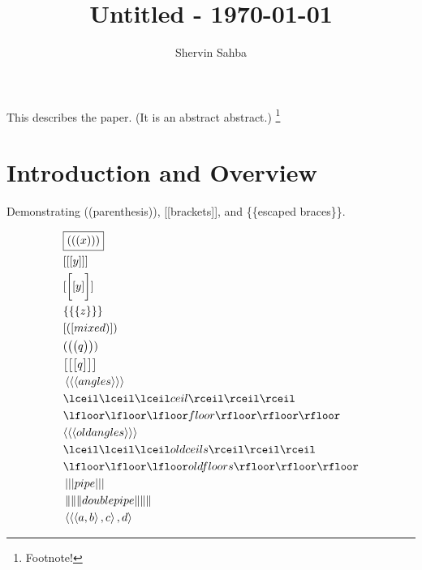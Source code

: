\documentclass{shervin} %
\begin{document}
\title{Untitled - \today}

\author{Shervin Sahba\authormark{}}
\address{\authormark{}Department of Physics, University of Washington, Seattle, USA.}

\begin{abstract*}
This describes the paper. (It is an abstract abstract.) \footnote{Footnote!}
\end{abstract*}


\section{Introduction and Overview} \label{sec: Introduction}

Demonstrating ((parenthesis)), [[brackets]], and \{\{escaped braces\}\}.

\begin{tcolorbox}[title=Cool Box, fonttitle=\bfseries, titlebox=visible, sidebyside, enhanced, frame style={left color=red!75!black,right color=blue!75!black}]
\begin{align}
&\boxed{(((x)))} \\
& [[[y]]] \\
& [\bigg[[y]\bigg]] \\
& \{\{\{z\}\}\} \\
& [([mixed)]) \\
& (\lp\lp q \rp\rp) \\
& \lb\lb\lb q \rb\rb\rb \\
& \langle\langle\langle angles \rangle\rangle\rangle \\
& \lceil\lceil\lceil ceil \rceil\rceil\rceil \\
& \lfloor\lfloor\lfloor floor \rfloor\rfloor\rfloor \\
& \oldlangle\oldlangle\oldlangle old angles \oldrangle\oldrangle\oldrangle \\
& \oldlceil\oldlceil\oldlceil old ceils \oldrceil\oldrceil\oldrceil \\
& \oldlfloor\oldlfloor\oldlfloor old floors \oldrfloor\oldrfloor\oldrfloor \\
& \left| \left| \left| pipe \right|\right|\right| \\
& \left\| \left\| \left\| doublepipe \right\|\right\|\right\| \\
&\innerprod{\innerprod{\innerprod{a}{b}}{c}}{d}
\end{align}

\tcblower
\lipsum[1]
\end{tcolorbox}
\end{document}

